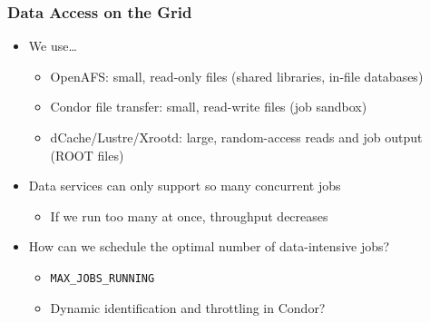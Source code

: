 \documentclass{beamer}
\begin{document}
\begin{frame}
\frametitle{Data Access on the Grid}
\begin{itemize}
	\item We use\ldots{}
	\begin{itemize}
		\item OpenAFS: small, read-only files (shared libraries, in-file databases)
		\item Condor file transfer: small, read-write files (job sandbox)
		\item dCache/Lustre/Xrootd: large, random-access reads and job output (ROOT files)
	\end{itemize}
	\item Data services can only support so many concurrent jobs
	\begin{itemize}
		\item If we run too many at once, throughput decreases
	\end{itemize}
	\item How can we schedule the optimal number of data-intensive jobs?
	\begin{itemize}
		\item {\tt MAX\_JOBS\_RUNNING}
		\item Dynamic identification and throttling in Condor?
	\end{itemize}
\end{itemize}
\end{frame}
\end{document}
